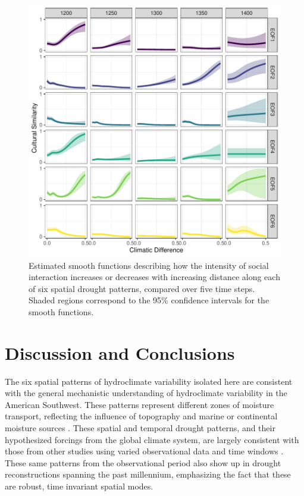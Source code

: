\documentclass[11pt]{iopart}
\begin{document}

\begin{figure}[!htbp]
\centering
\includegraphics[width=.8\linewidth]{figures/smooths.pdf}
\caption{Estimated smooth functions describing how the intensity of social interaction increases or decreases with increasing distance along each of six spatial drought patterns, compared over five time steps. Shaded regions correspond to the 95\% confidence intervals for the smooth functions.}
\label{fig:smooths}
\end{figure}

\section*{Discussion and Conclusions}

The six spatial patterns of hydroclimate variability isolated here are consistent with the general mechanistic understanding of hydroclimate variability in the American Southwest. These patterns represent different zones of moisture transport, reflecting the influence of topography and marine or continental moisture sources \parencite{Liu2010, Hu2011}. These spatial and temporal drought patterns, and their hypothesized forcings from the global climate system, are largely consistent with those from other studies using varied observational data and time windows \parencite{Comrie1999,Cook1999,McCabe1999,McCabe2004,Ryu2010,Seager2014,Herrmann2016}. These same patterns from the observational period also show up in drought reconstructions spanning the past millennium, emphasizing the fact that these are robust, time invariant spatial modes.
\end{document}
